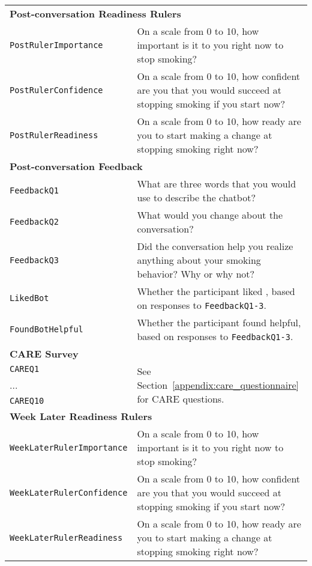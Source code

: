 \begin{longtable}{l p{10cm}}
\multicolumn{2}{l}{\textbf{Post-conversation Readiness Rulers}} \\
\texttt{PostRulerImportance} & On a scale from 0 to 10, how important is it to you right now to stop smoking?\\
\texttt{PostRulerConfidence} & On a scale from 0 to 10, how confident are you that you would succeed at stopping smoking if you start now?\\
\texttt{PostRulerReadiness} & On a scale from 0 to 10, how ready are you to start making a change at stopping smoking right now?\\
\midrule

\multicolumn{2}{l}{\textbf{Post-conversation Feedback}} \\
\texttt{FeedbackQ1} & What are three words that you would use to describe the chatbot?\\
\texttt{FeedbackQ2} & What would you change about the conversation?\\
\texttt{FeedbackQ3} & Did the conversation help you realize anything about your smoking behavior? Why or why not?\\
\texttt{LikedBot} & Whether the participant liked \sysname{}, based on responses to \texttt{Feedback\-Q1-3}.\\
\texttt{FoundBotHelpful} & Whether the participant found \sysname{} helpful, based on responses to \texttt{Feedback\-Q1-3}.\\
\midrule

\multicolumn{2}{l}{\textbf{CARE Survey}} \\
\texttt{CAREQ1} & \multirow{3}{*}{See Section~\ref{appendix:care_questionnaire} for CARE questions.}\\
... & \\
\texttt{CAREQ10} & \\
\midrule



\multicolumn{2}{l}{\textbf{Week Later Readiness Rulers}} \\
\texttt{WeekLaterRulerImportance} & On a scale from 0 to 10, how important is it to you right now to stop smoking?\\
\texttt{WeekLaterRulerConfidence} & On a scale from 0 to 10, how confident are you that you would succeed at stopping smoking if you start now?\\
\texttt{WeekLaterRulerReadiness} & On a scale from 0 to 10, how ready are you to start making a change at stopping smoking right now?\\
\midrule


\end{longtable}
